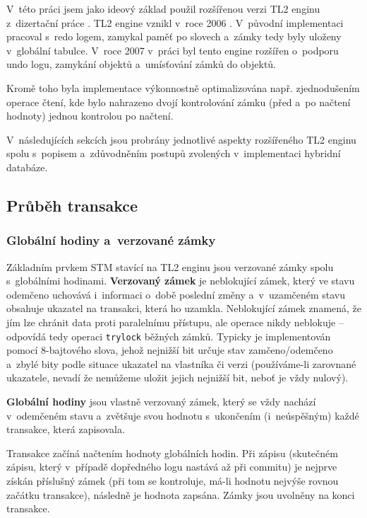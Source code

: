 V~této práci jsem jako ideový základ použil
rozšířenou verzi TL2 enginu z~dizertační práce \cite{STMcur}. TL2 engine
vznikl v~roce 2006 \cite{TL2engine}. V~původní implementaci pracoval s~redo logem,
zamykal paměť po slovech a~zámky tedy byly uloženy v~globální tabulce. V~roce
2007 v~práci \cite{STMcur} byl tento engine rozšířen o~podporu undo logu, zamykání
objektů a~umísťování zámků do objektů.

Kromě toho byla implementace výkonnostně optimalizována např. zjednodušením operace
čtení, kde bylo nahrazeno dvojí kontrolování zámku (před a~po načtení hodnoty)
jednou kontrolou po načtení.

V~následujících sekcích
jsou probrány jednotlivé aspekty rozšířeného TL2 enginu
spolu s~popisem a~zdůvodněním postupů zvolených v~implementaci hybridní databáze.


\subsection{Průběh transakce}

\subsubsection*{Globální hodiny a~verzované zámky}
Základním prvkem STM stavící na TL2 enginu jsou verzované zámky spolu s~globálními
hodinami. {\bf Verzovaný zámek} je neblokující zámek,
který ve stavu odemčeno uchovává i~informaci
o~době poslední změny a~v~uzamčeném stavu obsahuje ukazatel na transakci, která
ho uzamkla. Neblokující zámek znamená, že jím lze chránit data proti paralelnímu
přístupu, ale operace  nikdy neblokuje -- odpovídá tedy operaci
\verb|trylock| běžných zámků.
Typicky je implementován pomocí 8-bajtového slova, jehož nejnižší
bit určuje stav zamčeno/odemčeno a~zbylé bity podle situace ukazatel na vlastníka 
či verzi
(používáme-li zarovnané ukazatele, nevadí že nemůžeme uložit jejich nejnižší bit,
neboť je vždy nulový). 

{\bf Globální hodiny} jsou vlastně verzovaný zámek, který se vždy
nachází v~odemčeném
stavu a~zvětšuje svou hodnotu s~ukončením (i~neúspěšným) každé transakce,
která zapisovala.

Transakce začíná načtením hodnoty globálních hodin.  Při zápisu (skutečném zápisu,
který v~případě dopředného logu nastává až při commitu) je nejprve
získán příslušný zámek
(při tom se kontroluje, má-li hodnotu nejvýše rovnou začátku transakce),
následně je hodnota zapsána. Zámky jsou uvolněny na konci transakce.

